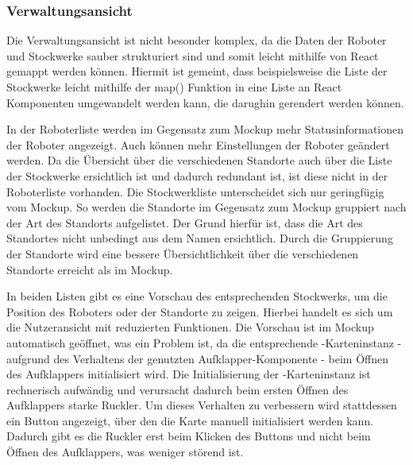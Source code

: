 
\subsubsection{Verwaltungsansicht}
Die Verwaltungsansicht ist nicht besonder komplex, da die Daten der Roboter und Stockwerke sauber strukturiert sind und somit leicht mithilfe von React gemappt werden können. Hiermit ist gemeint, dass beispielsweise die Liste der Stockwerke leicht mithilfe der map() Funktion in eine Liste an React Komponenten umgewandelt werden kann, die darughin gerendert werden können\cite{ReactMapping}.

In der Roboterliste werden im Gegensatz zum Mockup mehr Statusinformationen der Roboter angezeigt. Auch können mehr Einstellungen der Roboter geändert werden. Da die Übersicht über die verschiedenen Standorte auch über die Liste der Stockwerke ersichtlich ist und dadurch redundant ist, ist diese nicht in der Roboterliste vorhanden. Die Stockwerkliste unterscheidet sich nur geringfügig vom Mockup. So werden die Standorte im Gegensatz zum Mockup gruppiert nach der Art des Standorts aufgelistet. Der Grund hierfür ist, dass die Art des Standortes nicht unbedingt aus dem Namen ersichtlich. Durch die Gruppierung der Standorte wird eine bessere Übersichtlichkeit über die verschiedenen Standorte erreicht als im Mockup.

In beiden Listen gibt es eine Vorschau des entsprechenden Stockwerks, um die Position des Roboters oder der Standorte zu zeigen. Hierbei handelt es sich um die Nutzeransicht mit reduzierten Funktionen. Die Vorschau ist im Mockup automatisch geöffnet, was ein Problem ist, da die entsprechende \deckgl{}-Karteninstanz - aufgrund des Verhaltens der genutzten Aufklapper-Komponente - beim Öffnen des Aufklappers initialisiert wird. Die Initialisierung der \deckgl{}-Karteninstanz ist rechnerisch aufwändig und verursacht dadurch beim ersten Öffnen des Aufklappers starke Ruckler. Um dieses Verhalten zu verbessern wird stattdessen ein Button angezeigt, über den die Karte manuell initialisiert werden kann. Dadurch gibt es die Ruckler erst beim Klicken des Buttons und nicht beim Öffnen des Aufklappers, was weniger störend ist.


